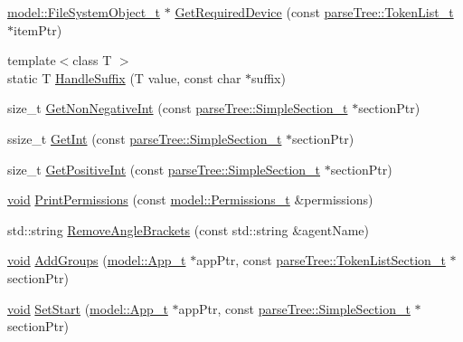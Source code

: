\begin{DoxyCompactItemize}
\hyperlink{structmodel_1_1_file_system_object__t}{model\+::\+File\+System\+Object\+\_\+t} $\ast$ \hyperlink{namespacemodeller_a2a361f32597ccc96e7319e24abb424b4}{Get\+Required\+Device} (const \hyperlink{structparse_tree_1_1_token_list__t}{parse\+Tree\+::\+Token\+List\+\_\+t} $\ast$item\+Ptr)
\item 
{\footnotesize template$<$class T $>$ }\\static T \hyperlink{namespacemodeller_acbd4d81070582ae1a86a237780119ccc}{Handle\+Suffix} (T value, const char $\ast$suffix)
\item 
size\+\_\+t \hyperlink{namespacemodeller_aa733cf887faf59dfc08867d9cf857664}{Get\+Non\+Negative\+Int} (const \hyperlink{structparse_tree_1_1_simple_section__t}{parse\+Tree\+::\+Simple\+Section\+\_\+t} $\ast$section\+Ptr)
\item 
ssize\+\_\+t \hyperlink{namespacemodeller_abaccf7d62495554831c1452e3e4c496e}{Get\+Int} (const \hyperlink{structparse_tree_1_1_simple_section__t}{parse\+Tree\+::\+Simple\+Section\+\_\+t} $\ast$section\+Ptr)
\item 
size\+\_\+t \hyperlink{namespacemodeller_afdd492f58fcf54565e24a3d191c13916}{Get\+Positive\+Int} (const \hyperlink{structparse_tree_1_1_simple_section__t}{parse\+Tree\+::\+Simple\+Section\+\_\+t} $\ast$section\+Ptr)
\item 
\hyperlink{_t_e_m_p_l_a_t_e__cdef_8h_ac9c84fa68bbad002983e35ce3663c686}{void} \hyperlink{namespacemodeller_a38ac84e4a31c00772b758443feaa30c7}{Print\+Permissions} (const \hyperlink{structmodel_1_1_permissions__t}{model\+::\+Permissions\+\_\+t} \&permissions)
\item 
std\+::string \hyperlink{namespacemodeller_ad349b735af62bcc6f4f5a1c56e7a9fbb}{Remove\+Angle\+Brackets} (const std\+::string \&agent\+Name)
\item 
\hyperlink{_t_e_m_p_l_a_t_e__cdef_8h_ac9c84fa68bbad002983e35ce3663c686}{void} \hyperlink{namespacemodeller_a41ac5f88e4d5830a9acd42e6fd2a23f0}{Add\+Groups} (\hyperlink{structmodel_1_1_app__t}{model\+::\+App\+\_\+t} $\ast$app\+Ptr, const \hyperlink{structparse_tree_1_1_token_list_section__t}{parse\+Tree\+::\+Token\+List\+Section\+\_\+t} $\ast$section\+Ptr)
\item 
\hyperlink{_t_e_m_p_l_a_t_e__cdef_8h_ac9c84fa68bbad002983e35ce3663c686}{void} \hyperlink{namespacemodeller_a5ac7cf1486b48dc18b0892c4ed2c199b}{Set\+Start} (\hyperlink{structmodel_1_1_app__t}{model\+::\+App\+\_\+t} $\ast$app\+Ptr, const \hyperlink{structparse_tree_1_1_simple_section__t}{parse\+Tree\+::\+Simple\+Section\+\_\+t} $\ast$section\+Ptr)

\end{DoxyCompactItemize}
